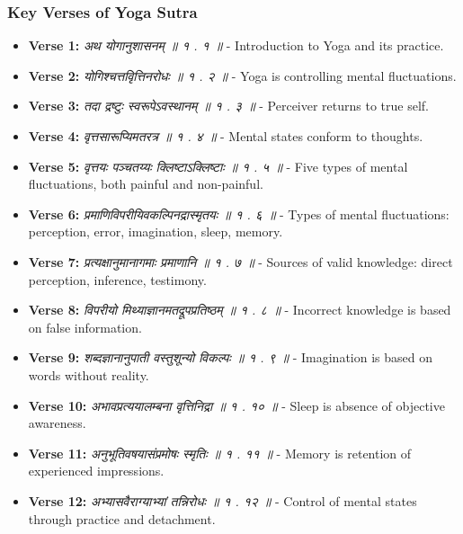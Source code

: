 \begin{frame}[fragile]\frametitle{Key Verses of Yoga Sutra}

    \begin{itemize}
        \item \textbf{Verse 1:} \textit{अथ योगानुशासनम् ॥ १ . १ ॥} - Introduction to Yoga and its practice.
        \item \textbf{Verse 2:} \textit{योगिश्चत्तवृित्तिनरोधः ॥ १ . २ ॥} - Yoga is controlling mental fluctuations.
        \item \textbf{Verse 3:} \textit{तदा द्रष्टुः स्वरूपेऽवस्थानम् ॥ १ . ३ ॥} - Perceiver returns to true self.
        \item \textbf{Verse 4:} \textit{वृत्तसारूप्यिमतरत्र ॥ १ . ४ ॥} - Mental states conform to thoughts.
        \item \textbf{Verse 5:} \textit{वृत्तयः पञ्चतय्यः क्लिष्टाऽक्लिष्टाः ॥ १ . ५ ॥} - Five types of mental fluctuations, both painful and non-painful.
        \item \textbf{Verse 6:} \textit{प्रमाणिविपरीयिवकल्पिनद्रास्मृतयः ॥ १ . ६ ॥} - Types of mental fluctuations: perception, error, imagination, sleep, memory.
        \item \textbf{Verse 7:} \textit{प्रत्यक्षानुमानागमाः प्रमाणानि ॥ १ . ७ ॥} - Sources of valid knowledge: direct perception, inference, testimony.
        \item \textbf{Verse 8:} \textit{विपरीयो मिथ्याज्ञानमतद्रूपप्रतिष्ठम् ॥ १ . ८ ॥} - Incorrect knowledge is based on false information.
        \item \textbf{Verse 9:} \textit{शब्दज्ञानानुपाती वस्तुशून्यो विकल्पः ॥ १ . ९ ॥} - Imagination is based on words without reality.
        \item \textbf{Verse 10:} \textit{अभावप्रत्ययालम्बना वृत्तिनिद्रा ॥ १ . १० ॥} - Sleep is absence of objective awareness.
        \item \textbf{Verse 11:} \textit{अनुभूतिवषयासंप्रमोषः स्मृतिः ॥ १ . ११ ॥} - Memory is retention of experienced impressions.
        \item \textbf{Verse 12:} \textit{अभ्यासवैराग्याभ्यां तन्निरोधः ॥ १ . १२ ॥} - Control of mental states through practice and detachment.
    \end{itemize}

\end{frame}

